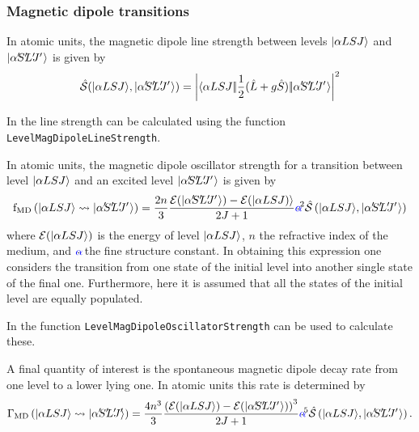 \documentclass{article}
\newcommand{\codetext}[1]{{\color{BlueViolet} \texttt{#1}}}
\begin{document}
\subsubsection{Magnetic dipole transitions}

In atomic units, the magnetic dipole line strength between levels $|\alpha{LSJ}\rangle$ and $\ket{\alpha\mathrlap{'} S\mathrlap{'} L\mathrlap{'} J\mathrlap{'}\,\,}$ is given by
\begin{equation} 
	\lineStrength(\ket{\alpha{LSJ}},\ket{\alpha\mathrlap{'} S\mathrlap{'} L\mathrlap{'} J\mathrlap{'}\,\,}) = 
	\left|\redbraopket{\alpha{LSJ}}{\frac{1}{2}(\op{L}+g \op{S})}{\alpha\mathrlap{'} S\mathrlap{'} L\mathrlap{'} J\mathrlap{'}\,\,} \right|^2
\end{equation}

In \qlanth the line strength can be calculated using the function \codetext{LevelMagDipoleLineStrength}.

 

In atomic units, the magnetic dipole oscillator strength for a transition between level $|\alpha{LSJ}\rangle$ and an excited level $\ket{\alpha\mathrlap{'} S\mathrlap{'} L\mathrlap{'} J\mathrlap{'}\,\,}$ is given by \cite{rudzikas_theoretical_2007}
\begin{equation} 
	\oStrength{MD}{\alpha{LSJ}}{\alpha\mathrlap{'} S\mathrlap{'} L\mathrlap{'} J\mathrlap{'}\,\,} = \frac{2 n}{3}
	\frac{
	\mathcal{E}(
		\ket{\alpha\mathrlap{'}
			S\mathrlap{'}
			L\mathrlap{'}
			J\mathrlap{'}\,\,})-
	\mathcal{E}(
		\ket{\alpha{LSJ}
		)}}
	{2J+1}
	\alphaFine^2
	\lineStrength\left(\ket{\alpha{LSJ}},\ket{\alpha\mathrlap{'} S\mathrlap{'} L\mathrlap{'} J\mathrlap{'}\,\,}\right)
\end{equation}
where $\mathcal{E}(|\alpha{LSJ}\rangle)$ is the energy of level $|\alpha{LSJ}\rangle$, $n$ the refractive index of the medium, and $\alphaFine$ the fine structure constant. In obtaining this expression one considers the transition from one state of the initial level into another single state of the final one. Furthermore, here it is assumed that all the states of the initial level are equally populated.

In \qlanth the function \codetext{LevelMagDipoleOscillatorStrength} can be used to calculate these.

 

A final quantity of interest is the spontaneous magnetic dipole decay rate from one level to a lower lying one. In atomic units this rate is determined by
\begin{equation}
	\decayRate{MD}{\alpha{LSJ}}{\alpha\mathrlap{'}
			S\mathrlap{'}
			L\mathrlap{'}
			J\mathrlap{'}} = \frac{4 n^3}{3} 
			\frac{
				\left(
					\mathcal{E}(
						\ket{\alpha{LSJ}}) - 
					\mathcal{E}(
						\ket{\alpha\mathrlap{'}
							S\mathrlap{'}
							L\mathrlap{'}
							J\mathrlap{'}\,\,})
				\right)^3
				}
				{2J+1} 
		\alphaFine^5
		\lineStrength\left(\ket{\alpha{LSJ}},\ket{\alpha\mathrlap{'} S\mathrlap{'} L\mathrlap{'} J\mathrlap{'}\,\,}\right).
\end{equation}
\end{document}
